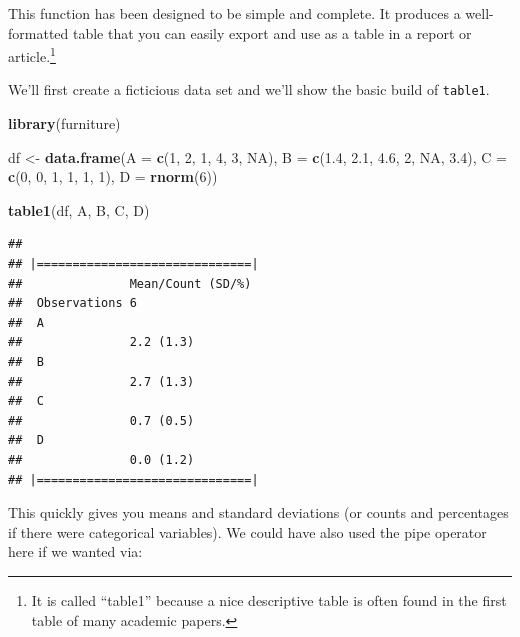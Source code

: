 \documentclass[]{tufte-book}
\newenvironment{Shaded}{}{}
\newcommand{\KeywordTok}[1]{\textcolor[rgb]{0.00,0.44,0.13}{\textbf{#1}}}
\newcommand{\DataTypeTok}[1]{\textcolor[rgb]{0.56,0.13,0.00}{#1}}
\newcommand{\DecValTok}[1]{\textcolor[rgb]{0.25,0.63,0.44}{#1}}
\newcommand{\FloatTok}[1]{\textcolor[rgb]{0.25,0.63,0.44}{#1}}
\newcommand{\StringTok}[1]{\textcolor[rgb]{0.25,0.44,0.63}{#1}}
\newcommand{\OtherTok}[1]{\textcolor[rgb]{0.00,0.44,0.13}{#1}}
\newcommand{\OperatorTok}[1]{\textcolor[rgb]{0.40,0.40,0.40}{#1}}
\newcommand{\NormalTok}[1]{#1}
\theoremstyle{definition}
\theoremstyle{definition}
\theoremstyle{remark}
\begin{document}
This function has been designed to be simple and complete. It produces a
well-formatted table that you can easily export and use as a table in a
report or article.\footnote{It is called ``table1'' because a nice
  descriptive table is often found in the first table of many academic
  papers.}

We'll first create a ficticious data set and we'll show the basic build
of \texttt{table1}.

\begin{Shaded}
\begin{Highlighting}[]
\KeywordTok{library}\NormalTok{(furniture)}

\NormalTok{df <-}\StringTok{ }\KeywordTok{data.frame}\NormalTok{(}\DataTypeTok{A =} \KeywordTok{c}\NormalTok{(}\DecValTok{1}\NormalTok{, }\DecValTok{2}\NormalTok{, }\DecValTok{1}\NormalTok{, }\DecValTok{4}\NormalTok{, }\DecValTok{3}\NormalTok{, }\OtherTok{NA}\NormalTok{), }\DataTypeTok{B =} \KeywordTok{c}\NormalTok{(}\FloatTok{1.4}\NormalTok{, }
    \FloatTok{2.1}\NormalTok{, }\FloatTok{4.6}\NormalTok{, }\DecValTok{2}\NormalTok{, }\OtherTok{NA}\NormalTok{, }\FloatTok{3.4}\NormalTok{), }\DataTypeTok{C =} \KeywordTok{c}\NormalTok{(}\DecValTok{0}\NormalTok{, }\DecValTok{0}\NormalTok{, }\DecValTok{1}\NormalTok{, }\DecValTok{1}\NormalTok{, }\DecValTok{1}\NormalTok{, }
    \DecValTok{1}\NormalTok{), }\DataTypeTok{D =} \KeywordTok{rnorm}\NormalTok{(}\DecValTok{6}\NormalTok{))}

\KeywordTok{table1}\NormalTok{(df, A, B, C, D)}
\end{Highlighting}
\end{Shaded}

\begin{verbatim}
## 
## |==============================|
##               Mean/Count (SD/%)
##  Observations 6                
##  A                             
##               2.2 (1.3)        
##  B                             
##               2.7 (1.3)        
##  C                             
##               0.7 (0.5)        
##  D                             
##               0.0 (1.2)        
## |==============================|
\end{verbatim}

This quickly gives you means and standard deviations (or counts and
percentages if there were categorical variables). We could have also
used the pipe operator here if we wanted via:

\begin{Shaded}
\end{Shaded}
\end{document}
